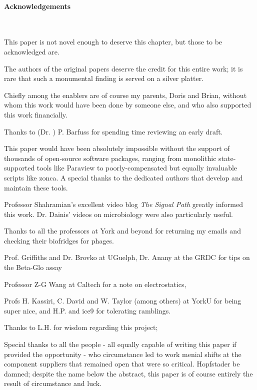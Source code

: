 \documentclass[paper.tex]{subfiles}
\begin{document}
	
\clearpage
\paragraph{Acknowledgements}\

This paper is not novel enough to deserve this chapter, but those to be acknowledged are.

The authors of the original papers deserve the credit for this entire work; it is rare that such a monumental finding is served on a silver platter.

Chiefly among the enablers are of course my parents, Doris and Brian, without whom this work would have been done by someone else, and who also supported this work financially. 

Thanks to (Dr. ) P. Barfuss for spending time reviewing an early draft.

This paper would have been absolutely impossible without the support of thousands of open-source software packages, ranging from monolithic state-supported tools like Paraview to poorly-compensated but equally invaluable scripts like zonca. A special thanks to the dedicated authors that develop and maintain these tools.

Professor Shahramian's excellent video blog {\it The Signal Path} greatly informed this work. Dr. Dainis' videos on microbiology were also particularly useful.

Thanks to all the professors at York and beyond for returning my emails and checking their biofridges for phages.

Prof. Griffiths and Dr. Brovko at UGuelph, Dr. Anany at the GRDC for tips on the Beta-Glo assay

Professor Z-G Wang at Caltech for a note on electrostatics, 

Profs H. Kassiri, C. David and W. Taylor (among others) at YorkU for being super nice, and H.P. and ice9 for tolerating ramblings.

Thanks to L.H. for wisdom regarding this project; 

Special thanks to all the people - all equally capable of writing this paper if provided the opportunity - who circumstance led to work menial shifts at the component suppliers that remained open that were so critical. Hopfstader be damned; despite the name below the abstract, this paper is of course entirely the result of circumstance and luck. 
\end{document}
